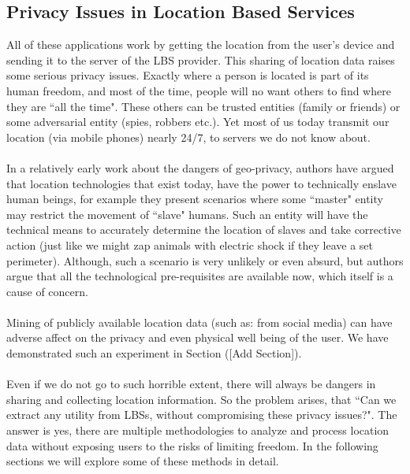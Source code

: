 \documentclass[12pt]{report}
\theoremstyle{named}
\begin{document}
\subsection{Privacy Issues in Location Based Services}
All of these applications work by getting the location from the user's device and sending it to the server of the LBS provider. This sharing of location data raises some serious privacy issues. Exactly where a person is located is part of its human freedom, and most of the time, people will no want others to find where they are ``all the time". These others can be trusted entities (family or friends) or some adversarial entity (spies, robbers etc.). Yet most of us today transmit our location (via mobile phones) nearly 24/7, to servers we do not know about.

\paragraph{}
In a relatively early work \cite{dobson2003geoslavery} about the dangers of geo-privacy, authors have argued that location technologies that exist today, have the power to technically enslave human beings, for example they present scenarios where some ``master" entity may restrict the movement of ``slave" humans. Such an entity will have the technical means to accurately determine the location of slaves and take corrective action (just like we might zap animals with electric shock if they leave a set perimeter). Although, such a scenario is very unlikely or even absurd, but authors argue that all the technological pre-requisites are available now, which itself is a cause of concern.

\paragraph{}
Mining of publicly available location data (such as: from social media) can have adverse affect on the privacy and even physical well being of the user. We have demonstrated such an experiment in Section ([Add Section]). 



\paragraph{}
Even if we do not go to such horrible extent, there will always be dangers in sharing and collecting location information. So the problem arises, that ``Can we extract any utility from LBSs, without compromising these privacy issues?". The answer is yes, there are multiple methodologies to analyze and process location data without exposing users to the risks of limiting freedom.  In the following sections we will explore some of these methods in detail.
\end{document}
